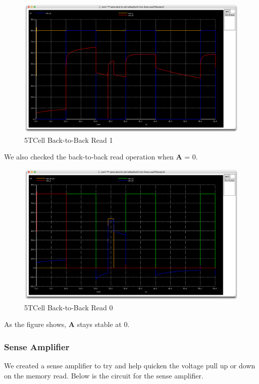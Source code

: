 \documentclass[a4paper]{article}
\begin{document}
 \begin{figure}[H]
	\centering
	\includegraphics[scale=0.12]{5TDoubleRead1}
	\caption{5TCell Back-to-Back Read 1}
	\label{fig:5TBackToBack1}
\end{figure}

We also checked the back-to-back read operation when \textbf{A} = 0.

 \begin{figure}[H]
	\centering
	\includegraphics[scale=0.12]{5TDoubleRead0}
	\caption{5TCell Back-to-Back Read 0}
	\label{fig:5TBackToBack0}
\end{figure}

As the figure shows, \textbf{A} stays stable at 0.

\subsubsection{Sense Amplifier}
We created a sense amplifier to try and help quicken the voltage pull up or down on the memory read. Below is the circuit for the sense amplifier.
\end{document}
